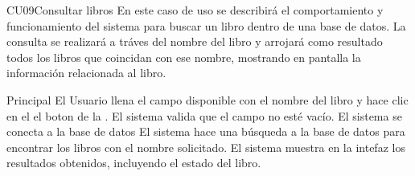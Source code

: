 
	\begin{UseCase}{CU09}{Consultar libros}{
		En este caso de uso se describirá el comportamiento y funcionamiento del sistema para buscar un libro dentro de una base de datos. La consulta se realizará a tráves del nombre del libro y arrojará como resultado todos los libros que coincidan con ese nombre, mostrando en pantalla la información relacionada al libro.
	}
	\end{UseCase}
	\begin{UCtrayectoria}{Principal}
		\UCpaso[\UCactor] El Usuario llena el campo disponible con el nombre del libro y hace clic en el el boton  de la .
		\UCpaso[\UCsist] El sistema valida que el campo no esté vacío. 
		\UCpaso[\UCsist] El sistema se conecta a la base de datos 
		\UCpaso[\UCsist] El sistema hace una búsqueda a la base de datos para encontrar los libros con el nombre solicitado. 
		\UCpaso[\UCsist] El sistema muestra en la intefaz  los resultados obtenidos, incluyendo el estado del libro.
	\end{UCtrayectoria}
